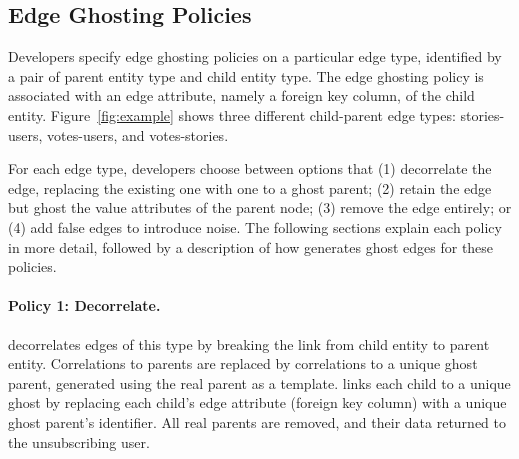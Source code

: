 
%

\subsection{Edge Ghosting Policies}
Developers specify edge ghosting policies on a particular edge type, identified by a pair of parent
entity type and child entity type. The edge ghosting policy is associated with an edge attribute,
namely a foreign key column, of the child entity. Figure~\ref{fig:example} shows three different
child-parent edge types: stories-users, votes-users, and votes-stories.

For each edge type, developers choose between options that (1) decorrelate the edge, replacing
the existing one with one to a ghost parent; (2) retain the edge but ghost the value attributes of the
parent node; (3) remove the edge entirely; or (4) add false edges to introduce noise.
The following sections explain each policy in more detail, followed by a description of how \sys
generates ghost edges for these policies.

\paragraph{Policy 1: Decorrelate.}
\sys decorrelates edges of this type by breaking the link from child entity to parent entity.
Correlations to parents are replaced by correlations to a unique ghost parent, generated using the
real parent as a template.  \sys links each child to a unique ghost by replacing each child's edge
attribute (foreign key column) with a unique ghost parent's identifier. 
All real parents are removed, and their data returned to the unsubscribing user.

